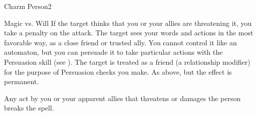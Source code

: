 \begin{spellsection}{Charm Person}{2}
    \begin{spellheader}
    \end{spellheader}
    \begin{spellcontent}
        \begin{spelltargetinginfo}
        \end{spelltargetinginfo}
        \begin{spelleffects}
            \begin{spellattack}{Magic vs. Will}
                \spellspecial If the target thinks that you or your allies are threatening it, you take a  penalty on the attack.
                \spellsuccess The target sees your words and actions in the most favorable way, as a close friend or trusted ally. You cannot control it like an automaton, but you can persuade it to take particular actions with the Persuasion skill (see ). The target is treated as a friend (a  relationship modifier) for the purpose of Persuasion checks you make.
                \spellcritical As above, but the effect is permanent.
            \end{spellattack}
            \spelldur \durlong
        \end{spelleffects}
    \end{spellcontent}
    \begin{spellfooter}
        \spellnotes Any act by you or your apparent allies that threatens or damages the  person breaks the spell.

        \subtlespellnotes

        \norepeatspellnotes
        \miscastrandom
    \end{spellfooter}
\end{spellsection}


